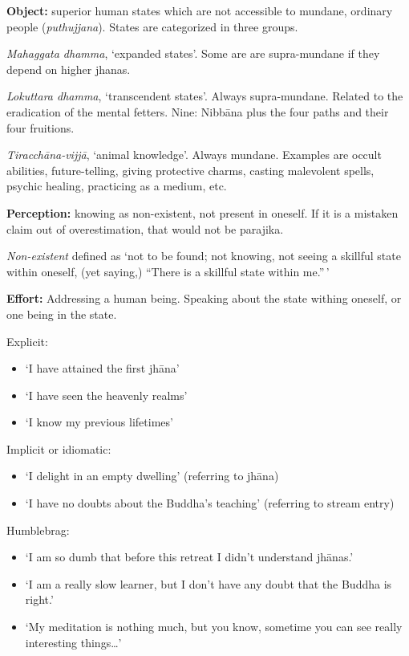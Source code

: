 \textbf{Object:} superior human states which are not accessible to
mundane, ordinary people (\emph{puthujjana}). States are categorized in
three groups.

\emph{Mahaggata dhamma}, `expanded states'. Some are are supra-mundane
if they depend on higher jhanas.

\emph{Lokuttara dhamma}, `transcendent states'. Always supra-mundane.
Related to the eradication of the mental fetters. Nine: Nibbāna plus the
four paths and their four fruitions.

\emph{Tiracchāna-vijjā}, `animal knowledge'. Always mundane. Examples
are occult abilities, future-telling, giving protective charms, casting
malevolent spells, psychic healing, practicing as a medium, etc.

\textbf{Perception:} knowing as non-existent, not present in oneself. If
it is a mistaken claim out of overestimation, that would not be
parajika.

\emph{Non-existent} defined as `not to be found; not knowing, not seeing
a skillful state within oneself, (yet saying,) ``There is a skillful
state within me.''\,'

\textbf{Effort:} Addressing a human being. Speaking about the state
withing oneself, or one being in the state.

Explicit:

\begin{itemize}
\tightlist
\item
  `I have attained the first jhāna'
\item
  `I have seen the heavenly realms'
\item
  `I know my previous lifetimes'
\end{itemize}

Implicit or idiomatic:

\begin{itemize}
\tightlist
\item
  `I delight in an empty dwelling' (referring to jhāna)
\item
  `I have no doubts about the Buddha's teaching' (referring to stream
  entry)
\end{itemize}

Humblebrag:

\begin{itemize}
\tightlist
\item
  `I am so dumb that before this retreat I didn't understand jhānas.'
\item
  `I am a really slow learner, but I don't have any doubt that the
  Buddha is right.'
\item
  `My meditation is nothing much, but you know, sometime you can see
  really interesting things\ldots{}'
\end{itemize}

